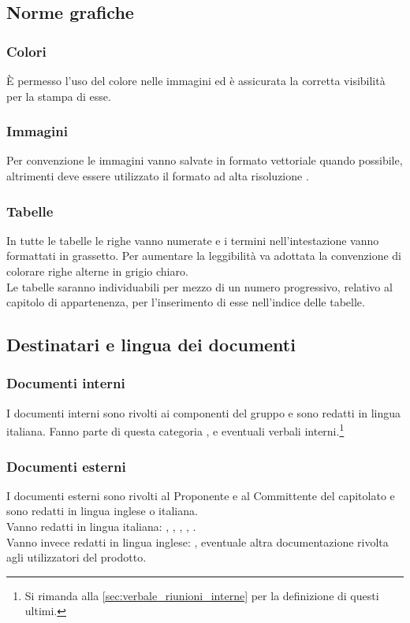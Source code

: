 \subsection{Norme grafiche}
\subsubsection{Colori}
È permesso l'uso del colore nelle immagini ed è assicurata la corretta visibilità per la stampa di esse.

\subsubsection{Immagini}
Per convenzione le immagini vanno salvate in formato vettoriale  quando possibile, altrimenti deve essere utilizzato il formato ad alta risoluzione .

\subsubsection{Tabelle}
In tutte le tabelle le righe vanno numerate e i termini nell'intestazione vanno formattati in grassetto.
Per aumentare la leggibilità va adottata la convenzione di colorare righe alterne in grigio chiaro.\\
Le tabelle saranno individuabili per mezzo di un numero progressivo, relativo al capitolo di appartenenza, per l'inserimento di esse nell'indice delle tabelle.

\subsection{Destinatari e lingua dei documenti}
\subsubsection{Documenti interni}
I documenti interni sono rivolti ai componenti del gruppo e sono redatti in lingua italiana. Fanno parte di questa categoria \NormeDiProgetto, \StudioDiFattibilita\space e eventuali verbali interni.\footnote{Si rimanda alla \sezione\ref{sec:verbale_riunioni_interne} per la definizione di questi ultimi.}

\subsubsection{Documenti esterni}
I documenti esterni sono rivolti al Proponente e al Committente del capitolato e sono redatti in lingua inglese o italiana.\\
Vanno redatti in lingua italiana: \PianoDiProgetto, \PianoDiQualifica, \SpecificaTecnica, \DefinizioneDiProdotto, \Glossario.\\
Vanno invece redatti in lingua inglese: \ManualeUtente, eventuale altra documentazione rivolta agli utilizzatori del prodotto.

